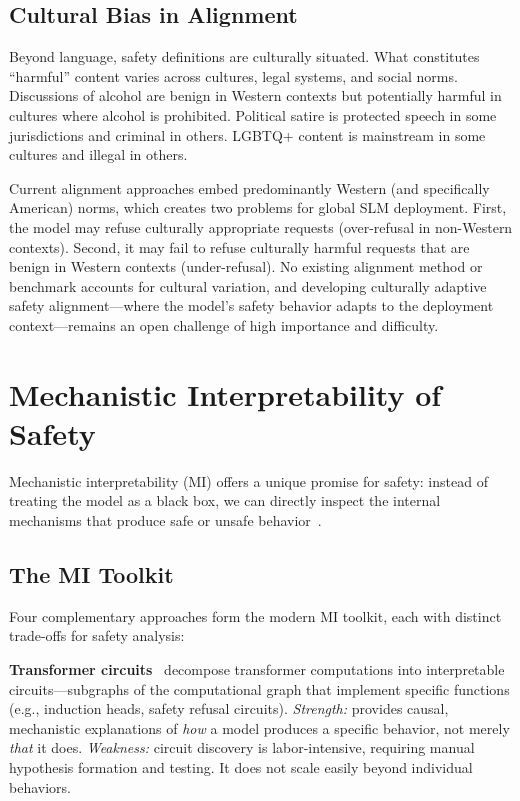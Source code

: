 \documentclass[12pt,a4paper]{article}
\begin{document}
\subsection{Cultural Bias in Alignment}

Beyond language, safety definitions are culturally situated. What constitutes ``harmful'' content varies across cultures, legal systems, and social norms. Discussions of alcohol are benign in Western contexts but potentially harmful in cultures where alcohol is prohibited. Political satire is protected speech in some jurisdictions and criminal in others. LGBTQ+ content is mainstream in some cultures and illegal in others.

Current alignment approaches embed predominantly Western (and specifically American) norms, which creates two problems for global SLM deployment. First, the model may refuse culturally appropriate requests (over-refusal in non-Western contexts). Second, it may fail to refuse culturally harmful requests that are benign in Western contexts (under-refusal). No existing alignment method or benchmark accounts for cultural variation, and developing culturally adaptive safety alignment---where the model's safety behavior adapts to the deployment context---remains an open challenge of high importance and difficulty.

\section{Mechanistic Interpretability of Safety}\label{sec:interp}

Mechanistic interpretability (MI) offers a unique promise for safety: instead of treating the model as a black box, we can directly inspect the internal mechanisms that produce safe or unsafe behavior~\citep{bereska2024mi}.

\subsection{The MI Toolkit}

Four complementary approaches form the modern MI toolkit, each with distinct trade-offs for safety analysis:

\textbf{Transformer circuits}~\citep{elhage2021mathematical} decompose transformer computations into interpretable circuits---subgraphs of the computational graph that implement specific functions (e.g., induction heads, safety refusal circuits). \emph{Strength:} provides causal, mechanistic explanations of \emph{how} a model produces a specific behavior, not merely \emph{that} it does. \emph{Weakness:} circuit discovery is labor-intensive, requiring manual hypothesis formation and testing. It does not scale easily beyond individual behaviors.
\end{document}
